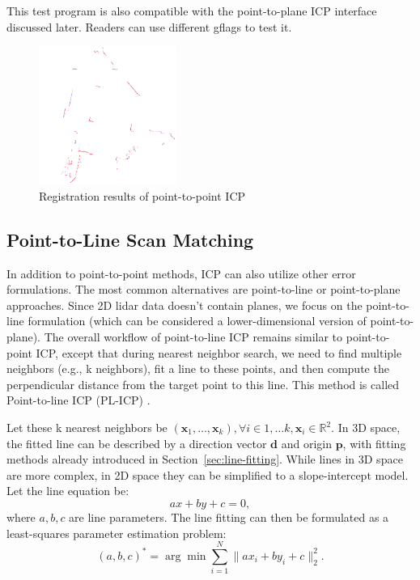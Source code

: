 This test program is also compatible with the point-to-plane ICP interface discussed later. Readers can use different gflags to test it.

\begin{figure}[!htp]
	\centering
	\includegraphics[width=0.4\textwidth]{resources/2d-lidar-mapping/2dicp-s2s}
	\caption{Registration results of point-to-point ICP}
	\label{fig:2dicp-s2s}
\end{figure}

\subsection{Point-to-Line Scan Matching}  
In addition to point-to-point methods, ICP can also utilize other error formulations. The most common alternatives are point-to-line or point-to-plane approaches. Since 2D lidar data doesn't contain planes, we focus on the point-to-line formulation (which can be considered a lower-dimensional version of point-to-plane). The overall workflow of point-to-line ICP remains similar to point-to-point ICP, except that during nearest neighbor search, we need to find multiple neighbors (e.g., k neighbors), fit a line to these points, and then compute the perpendicular distance from the target point to this line. This method is called Point-to-line ICP (PL-ICP) \cite{Censi2008}.

Let these k nearest neighbors be $(\bm{x}_1, \ldots, \bm{x}_k), \forall i \in 1, \ldots k, \bm{x}_i \in \mathbb{R}^2$. In 3D space, the fitted line can be described by a direction vector $\bm{d}$ and origin $\bm{p}$, with fitting methods already introduced in Section~\ref{sec:line-fitting}. While lines in 3D space are more complex, in 2D space they can be simplified to a slope-intercept model. Let the line equation be:
\begin{equation}\label{key}
	a x + by + c = 0,
\end{equation}
where $a,b,c$ are line parameters. The line fitting can then be formulated as a least-squares parameter estimation problem:
\begin{equation}\label{key}
	(a,b,c)^* = \arg \min \sum_{i=1}^N \| a x_i + by_i + c \|_2^2 .
\end{equation}

